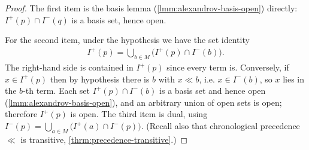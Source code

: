 \begin{proof}
    \leanok
    The first item is the basis lemma (\ref{lmm:alexandrov-basis-open}) directly: $I^+(p) \cap I^-(q)$ is a basis set, hence open.

    For the second item, under the hypothesis we have the set identity
    \begin{align}
        I^+(p) = \bigcup_{b \in M} \bigl(I^+(p) \cap I^-(b)\bigr).
    \end{align}
    The right-hand side is contained in $I^+(p)$ since every term is. Conversely, if $x \in I^+(p)$ then by hypothesis there is $b$ with $x \ll b$, i.e. $x \in I^-(b)$, so $x$ lies in the $b$-th term. Each set $I^+(p) \cap I^-(b)$ is a basis set and hence open (\ref{lmm:alexandrov-basis-open}), and an arbitrary union of open sets is open; therefore $I^+(p)$ is open. The third item is dual, using $I^-(p) = \bigcup_{a \in M} \bigl(I^+(a) \cap I^-(p)\bigr)$. (Recall also that chronological precedence $\ll$ is transitive, \ref{thrm:precedence-transitive}.)
\end{proof}


